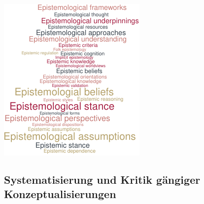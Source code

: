 \documentclass[]{tufte-handout}
\begin{document}
\begin{marginfigure}
\includegraphics{Handout_files/figure-latex/fig-margin1-1} 
\caption{}
\label{fig:fig-margin1}
\end{marginfigure}


\subsection{Systematisierung und Kritik gängiger
Konzeptualisierungen}\label{systematisierung-und-kritik-gangiger-konzeptualisierungen}
\end{document}

